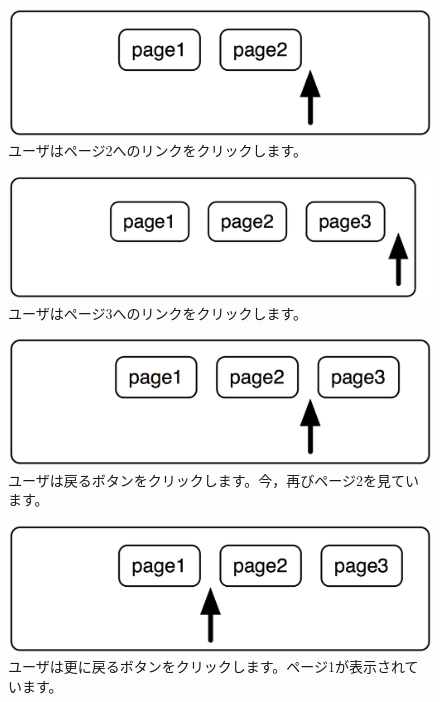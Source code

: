 \documentclass[a4paper,10pt,twoside]{book}
\begin{document}
{\begin{figure}[!ht]
\centerline{\includegraphics[scale=0.5]{page2Stef}}
\caption{ユーザはページ2へのリンクをクリックします。}
\vspace{.2in}
\end{figure}

\begin{figure}[!ht]
\centerline{\includegraphics[scale=0.5]{page3Stef}}
\caption{ユーザはページ3へのリンクをクリックします。}
\vspace{.2in}
\end{figure}

\begin{figure}[!ht]
\centerline{\includegraphics[scale=0.5]{page2_Stef}}
\caption{ユーザは戻るボタンをクリックします。今，再びページ2を見ています。}
\vspace{.2in}
\end{figure}

\begin{figure}[!ht]
\centerline{\includegraphics[scale=0.5]{page1_Stef}}
\caption{ユーザは更に戻るボタンをクリックします。ページ1が表示されています。}
\vspace{.2in}
\end{figure}

}
\end{document}

